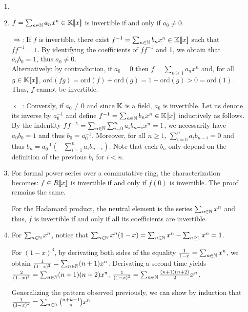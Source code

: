 \begin{solution}
    \begin{enumerate}
        \item[]
        \item $f = \sum_{n \in \mathbb N} a_n x^n \in \mathbb K[\![x]\!]$
            is invertible if and only if $a_0 \neq 0$.

            $\Rightarrow$: If $f$ is invertible, there exist
            $f^{-1} = \sum_{n \in \mathbb N} b_n x^n \in
            \mathbb K[\![x]\!]$ such that $ff^{-1} = 1$.
            By identifying the coefficients of $ff^{-1}$ and 1,
            we obtain that $a_0 b_0 = 1$, thus $a_0 \neq 0$.\\
            Alternatively: by contradiction, if $a_0 = 0$ then $f =
            \sum_{n \geq 1} a_n x^n$ and, for all $g \in
            \mathbb K[\![x]\!]$, $\mathrm{ord}(fg) =
            \mathrm{ord}(f) + \mathrm{ord}(g) = 1+\mathrm{ord}(g)
            > 0 = \mathrm{ord}(1)$.
            Thus, $f$ cannot be invertible.

            $\Leftarrow$: Conversly, if $a_0 \neq 0$ and since
            $\mathbb K$ is a field, $a_0$ is invertible.
            Let us denote its inverse by $a_0^{-1}$ and define
            $f^{-1} = \sum_{n \in \mathbb N} b_n x^n \in
            \mathbb K[\![x]\!]$ inductively as follows.
            By the indentity $ff^{-1} = \sum_{n \in \mathbb N} \sum_{i=0}^n
            a_i b_{n-i} x^n = 1$, we necessarily have $a_0 b_0 = 1$
            and thus $b_0 = a_0^{-1}$.
            Moreover, for all $n \geq 1$, $\sum_{i=0}^n a_i b_{n-i} =
            0$ and thus $b_n =a_0^{-1}\left(-\sum_{i=1}^n a_i b_{n-i}\right)$.
            Note that each $b_n$ only depend on the definition of the
            previous $b_i$ for $i<n$.
        \item For formal power series over a commutative ring, the
            characterization becomes: $f \in R[\![x]\!]$ is
            invertible if and only if $f(0)$ is invertible.
            The proof remains the same.

            For the Hadamard product, the neutral element is the
            series $\sum_{n \in \mathbb N} x^n$ and thus, $f$ is invertible
            if and only if all its coefficients are invertible.
        \item For $\sum_{n \in \mathbb N} x^n$, notice that $\sum_{n \in \mathbb N}
            x^n(1-x)= \sum_{n \in \mathbb N} x^n - \sum_{n \geq 1} x^n = 1$.

            For $(1-x)^3$, by derivating both sides of the equality
            $\frac{1}{1-x} = \sum_{n \in \mathbb N} x^n$, we obtain
            $\frac{1}{(1-x)^2} = \sum_{n \in \mathbb N} (n+1) x^n$.
            Derivating a second time yields $\frac{2}{(1-x)^3} =
            \sum_{n \in \mathbb N} (n+1)(n+2) x^n$, \ie $\frac{1}{(1-x)^3} =
            \sum_{n \in \mathbb N} \frac{(n+1)(n+2)}{2} x^n$.

            Generalizing the pattern observed previously, we can show
            by induction that $\frac{1}{(1-x)^k} = \sum_{n \in \mathbb N}
            \binom{n+k-1}{n} x^n$.
    \end{enumerate}
\end{solution}

